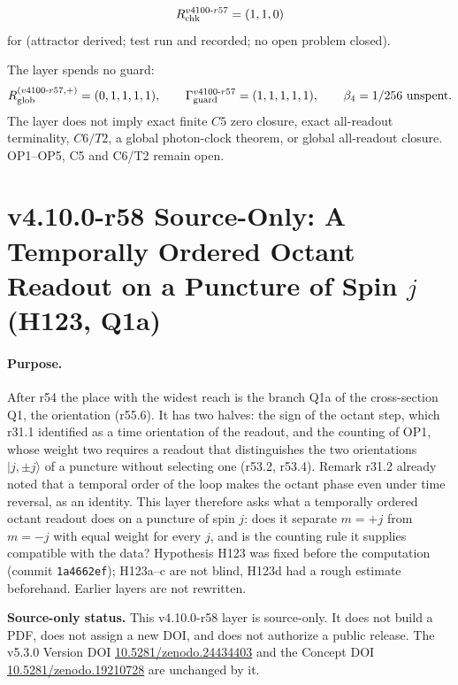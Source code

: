 \[
R_{\rm chk}^{v4100\text{-}r57}=(1,1,0)
\]
for (attractor derived; test run and recorded; no open problem closed).

The layer spends no guard:
\[
R_{\rm glob}^{(v4100\text{-}r57,+)}=(0,1,1,1,1),
\qquad
\Gamma_{\rm guard}^{v4100\text{-}r57}=(1,1,1,1,1),
\qquad
\beta_4=1/256\ \text{unspent}.
\]
The layer does not imply exact finite \(C5\) zero closure, exact all-readout terminality, \(C6/T2\), a global photon-clock theorem,
or global all-readout closure.  OP1--OP5, C5 and C6/T2 remain open.

\clearpage
\section*{v4.10.0-r58 Source-Only: A Temporally Ordered Octant Readout on a Puncture of Spin \(j\) (H123, Q1a)}
\label{sec:v4100-r58-temporal-octant}

\paragraph{Purpose.}
After r54 the place with the widest reach is the branch Q1a of the cross-section Q1, the orientation (r55.6).  It has two halves: the sign of
the octant step, which r31.1 identified as a time orientation of the readout, and the counting of OP1, whose weight two requires a readout that
distinguishes the two orientations \(|j,\pm j\rangle\) of a puncture without selecting one (r53.2, r53.4).  Remark r31.2 already noted that a temporal
order of the loop makes the octant phase even under time reversal, as an identity.  This layer therefore asks what a temporally ordered
octant readout does on a puncture of spin \(j\): does it separate \(m=+j\) from \(m=-j\) with equal weight for every \(j\), and is the counting rule it
supplies compatible with the data?  Hypothesis H123 was fixed before the computation (commit \texttt{1a4662ef}); H123a--c are not blind,
H123d had a rough estimate beforehand.  Earlier layers are not rewritten.

\noindent\textbf{Source-only status.}
This v4.10.0-r58 layer is source-only.  It does not build a PDF, does not assign a new DOI,
and does not authorize a public release.  The v5.3.0 Version DOI
\href{https://doi.org/10.5281/zenodo.24434403}{10.5281/zenodo.24434403} and the Concept DOI
\href{https://doi.org/10.5281/zenodo.19210728}{10.5281/zenodo.19210728} are unchanged by it.

